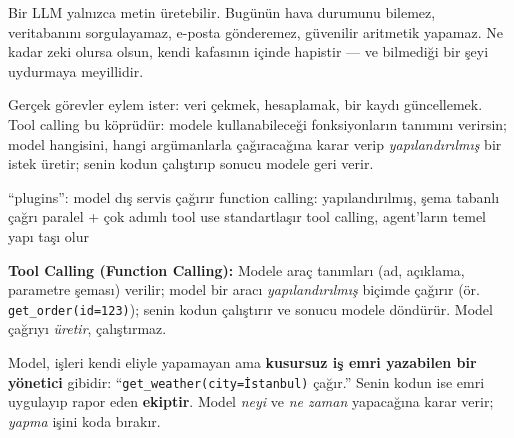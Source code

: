 

Bir LLM yalnızca metin üretebilir. Bugünün hava durumunu bilemez, veritabanını
sorgulayamaz, e-posta gönderemez, güvenilir aritmetik yapamaz. Ne kadar zeki
olursa olsun, kendi kafasının içinde hapistir --- ve bilmediği bir şeyi
uydurmaya meyillidir.


Gerçek görevler eylem ister: veri çekmek, hesaplamak, bir kaydı güncellemek.
Tool calling bu köprüdür: modele kullanabileceği fonksiyonların tanımını
verirsin; model hangisini, hangi argümanlarla çağıracağına karar verip
\emph{yapılandırılmış} bir istek üretir; senin kodun çalıştırıp sonucu modele
geri verir.

\begin{timeline}
 ``plugins'': model dış servis çağırır \tlsep {} function calling: yapılandırılmış, şema tabanlı çağrı \tlsep {} paralel + çok adımlı tool use standartlaşır \tlsep {} tool calling, agent'ların temel yapı taşı olur
\end{timeline}

\begin{problembox}
\textbf{Tool Calling (Function Calling):} Modele araç tanımları (ad, açıklama,
parametre şeması) verilir; model bir aracı \emph{yapılandırılmış} biçimde çağırır
(ör. \texttt{get\_order(id=123)}); senin kodun çalıştırır ve sonucu modele
döndürür. Model çağrıyı \emph{üretir}, çalıştırmaz.
\end{problembox}

\begin{mentalbox}
Model, işleri kendi eliyle yapamayan ama \textbf{kusursuz iş emri yazabilen bir
yönetici} gibidir: ``\texttt{get\_weather(city=İstanbul)} çağır.'' Senin kodun
ise emri uygulayıp rapor eden \textbf{ekiptir}. Model \emph{neyi} ve \emph{ne
zaman} yapacağına karar verir; \emph{yapma} işini koda bırakır.
\end{mentalbox}

